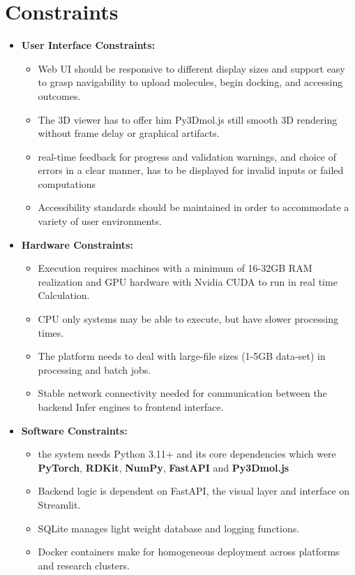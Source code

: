 \documentclass[12pt,a4]{report}
\begin{document}
\section{Constraints}

\begin{itemize}

\item \textbf{User Interface Constraints:}
\begin{itemize}
\item Web UI should be responsive to different display sizes and support easy to grasp navigability to upload molecules, begin docking, and accessing outcomes.
\item The 3D viewer has to offer him Py3Dmol.js still smooth 3D rendering without frame delay or graphical artifacts.
\item real-time feedback for progress and validation warnings, and choice of errors in a clear manner, has to be displayed for invalid inputs or failed computations
\item Accessibility standards should be maintained in order to accommodate a variety of user environments.
\end{itemize}

\item \textbf{Hardware Constraints:}
\begin{itemize}
\item Execution requires machines with a minimum of 16-32GB RAM realization and GPU hardware with Nvidia CUDA to run in real time Calculation.
\item CPU only systems may be able to execute, but have slower processing times.
\item The platform needs to deal with large-file sizes (1-5GB data-set) in processing and batch jobs.
\item Stable network connectivity needed for communication between the backend Infer engines to frontend interface.
\end{itemize}

\item \textbf{Software Constraints:}
\begin{itemize}
\item the system needs Python 3.11+ and its core dependencies which were \textbf{PyTorch}, \textbf{RDKit}, \textbf{NumPy}, \textbf{FastAPI} and \textbf{Py3Dmol.js}
\item Backend logic is dependent on FastAPI, the visual layer and interface on Streamlit.
\item SQLite manages light weight database and logging functions.
\item Docker containers make for homogeneous deployment across platforms and research clusters.
\end{itemize}


\end{itemize}
\end{document}
